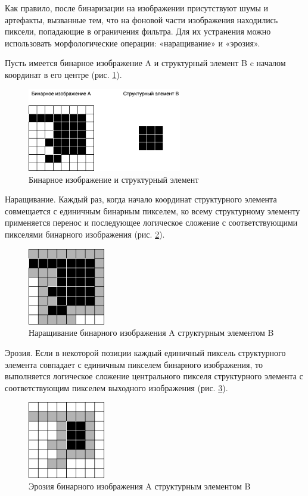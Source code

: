 Как правило, после бинаризации на изображении присутствуют шумы и артефакты, вызванные тем, что на фоновой части изображения находились пиксели,
попадающие в ограничения фильтра. Для их устранения можно использовать морфологические операции: «наращивание» и «эрозия»\cite{DIP}.

Пусть имеется бинарное изображение A и структурный элемент B c началом координат в его центре (рис. \ref{an:morph}).

\begin{figure}[!h]
	\centering
	\includegraphics[width=0.6\textwidth]{inc/img/morf}
	\caption{Бинарное изображение и структурный элемент}
	\label{an:morph}
\end{figure}

Наращивание. Каждый раз, когда начало координат структурного элемента совмещается с единичным бинарным пикселем, ко всему структурному элементу применяется перенос и последующее логическое сложение с соответствующими пикселями бинарного изображения (рис. \ref{an:dil}).

\begin{figure}[!h]
	\centering
	\includegraphics[width=0.3\textwidth]{inc/img/dil}
	\caption{Наращивание бинарного изображения A структурным элементом B}
	\label{an:dil}
\end{figure}

Эрозия. Если в некоторой позиции каждый единичный пиксель структурного элемента совпадает с единичным пикселем бинарного изображения, то выполняется логическое сложение центрального пикселя структурного элемента с соответствующим пикселем выходного изображения (рис. \ref{an:eros}).

\begin{figure}[!h]
	\centering
	\includegraphics[width=0.3\textwidth]{inc/img/eros}
	\caption{Эрозия бинарного изображения A структурным элементом B}
	\label{an:eros}
\end{figure}

